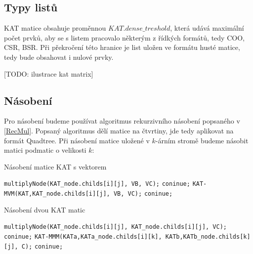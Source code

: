 \subsection{Typy listů}

KAT matice obsahuje proměnnou $KAT.dense\_treshold$, která udává maximální počet prvků, aby se s listem pracovalo některým z řídkých formátů, tedy COO, CSR, BSR. Při překročení této hranice je list uložen ve formátu husté matice, tedy bude obsahovat i nulové prvky.

[TODO: ilustrace kat matrix]

\subsection{Násobení}

Pro násobení budeme používat algoritmus rekurzivního násobení popsaného v \ref{RecMul}. Popsaný algoritmus dělí matice na čtvrtiny, jde tedy aplikovat na formát Quadtree. Při násobení matice uložené v $k$-árním stromě budeme násobit matici podmatic o velikosti $k$:

\label{alg:kat-mvm}
\begin{algorithm}[htb]
	\caption{Násobení matice KAT s vektorem}\label{kat-mvm}
	\begin{algorithmic}[1]
						\State \texttt{multiplyNode(KAT\_node.childs[i][j], VB, VC);}
						\State \texttt{coninue;}
					\EndIf
						\State \texttt{KAT-MVM(KAT,KAT\_node.childs[i][j], VB, VC);}
						\State \texttt{coninue;}
					\EndIf
				\EndIf
			\EndFor
		\EndFor
		\EndProcedure
	\end{algorithmic}
\end{algorithm}

\label{alg:kat-mmm}
\begin{algorithm}[htb]
	\caption{Násobení dvou KAT matic}\label{kat-mmm}
	\begin{algorithmic}[1]
							\State \texttt{multiplyNode(KAT\_node.childs[i][j], KAT\_node.childs[i][j], VC);}
							\State \texttt{coninue;}
						\EndIf
							\State \texttt{KAT-MMM(KATa,KATa\_node.childs[i][k], KATb,KATb\_node.childs[k][j], C);}
							\State \texttt{coninue;}
						\EndIf
					\EndIf
				\EndFor
			\EndFor
		\EndFor
		\EndProcedure
	\end{algorithmic}
\end{algorithm}

